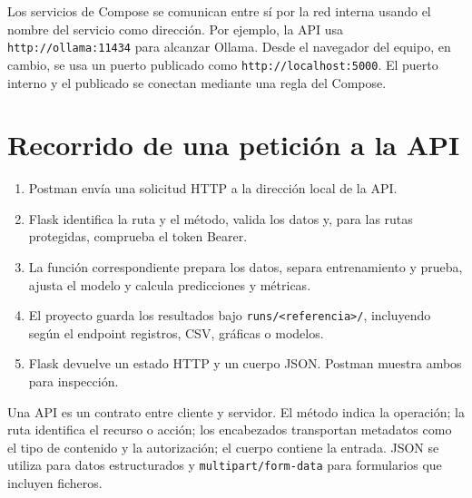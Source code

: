 \documentclass[11pt,a4paper]{article}
\begin{document}
Los servicios de Compose se comunican entre sí por la red interna usando el nombre del servicio como dirección. Por ejemplo, la API usa \texttt{http://ollama:11434} para alcanzar Ollama. Desde el navegador del equipo, en cambio, se usa un puerto publicado como \texttt{http://localhost:5000}. El puerto interno y el publicado se conectan mediante una regla del Compose.

\section{Recorrido de una petición a la API}
\begin{enumerate}
\item Postman envía una solicitud HTTP a la dirección local de la API.
\item Flask identifica la ruta y el método, valida los datos y, para las rutas protegidas, comprueba el token Bearer.
\item La función correspondiente prepara los datos, separa entrenamiento y prueba, ajusta el modelo y calcula predicciones y métricas.
\item El proyecto guarda los resultados bajo \texttt{runs/<referencia>/}, incluyendo según el endpoint registros, CSV, gráficas o modelos.
\item Flask devuelve un estado HTTP y un cuerpo JSON. Postman muestra ambos para inspección.
\end{enumerate}

Una API es un contrato entre cliente y servidor. El método indica la operación; la ruta identifica el recurso o acción; los encabezados transportan metadatos como el tipo de contenido y la autorización; el cuerpo contiene la entrada. JSON se utiliza para datos estructurados y \texttt{multipart/form-data} para formularios que incluyen ficheros.
\end{document}
